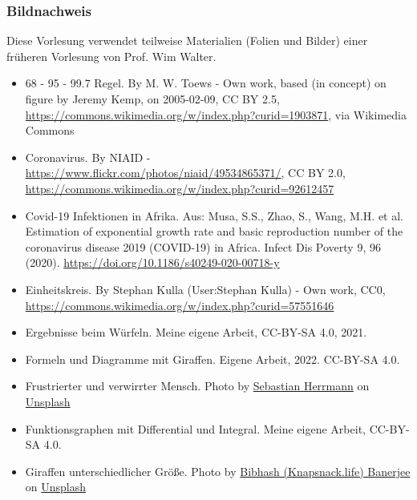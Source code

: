 \documentclass{beamer}
\begin{document}
\begin{frame}
\frametitle{Bildnachweis}

Diese Vorlesung verwendet teilweise Materialien (Folien und Bilder) einer früheren Vorlesung von Prof. Wim Walter.  

\vfill

\begin{tiny}
 
\begin{itemize}


\item
 68 - 95 - 99.7 Regel. By M. W. Toews - Own work, based (in concept) on figure by Jeremy Kemp, on 2005-02-09, CC BY 2.5, \url{https://commons.wikimedia.org/w/index.php?curid=1903871}, via Wikimedia Commons


\item
Coronavirus. By NIAID - \url{https://www.flickr.com/photos/niaid/49534865371/}, CC BY 2.0, \url{https://commons.wikimedia.org/w/index.php?curid=92612457}
\item
Covid-19 Infektionen in Afrika. Aus: Musa, S.S., Zhao, S., Wang, M.H. et al. Estimation of exponential growth rate and basic reproduction number of the coronavirus disease 2019 (COVID-19) in Africa. Infect Dis Poverty 9, 96 (2020). \url{https://doi.org/10.1186/s40249-020-00718-y}



\item
Einheitskreis. By Stephan Kulla (User:Stephan Kulla) - Own work, CC0, \url{https://commons.wikimedia.org/w/index.php?curid=57551646}

\item
Ergebnisse beim Würfeln. Meine eigene Arbeit, CC-BY-SA 4.0, 2021.

\item

Formeln und Diagramme mit Giraffen. Eigene Arbeit, 2022. CC-BY-SA 4.0.

\item
Frustrierter und verwirrter Mensch. Photo by \href{https://unsplash.com/@officestock?utm_source=unsplash&utm_medium=referral&utm_content=creditCopyText}{Sebastian Herrmann} on \href{https://unsplash.com/s/photos/frustration?utm_source=unsplash&utm_medium=referral&utm_content=creditCopyText}{Unsplash}

\item
Funktionsgraphen mit Differential und Integral. Meine eigene Arbeit, CC-BY-SA 4.0.


\item
Giraffen unterschiedlicher Größe. Photo by \href{https://unsplash.com/@perventuator?utm_source=unsplash&utm_medium=referral&utm_content=creditCopyText}{Bibhash (Knapsnack.life) Banerjee} on \href{https://unsplash.com/s/photos/giraffe?utm_source=unsplash&utm_medium=referral&utm_content=creditCopyText}{Unsplash}
  



\end{itemize}
\end{tiny}
\end{frame}
\end{document}
